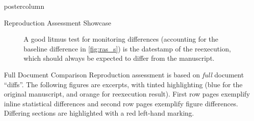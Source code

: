 \begin{frame}
\begin{columns}
\begin{column}{.59\textwidth}
\begin{beamercolorbox}[center]{postercolumn}
\begin{minipage}{.98\textwidth}
{\begin{myblock}{Reproduction Assessment Showcase}
\begin{minipage}{.38\textwidth}
\begin{figure}
{							}
						\end{figure}
						\begin{figure}
							\vspace{0.5em}
							\caption{
								A good litmus test for monitoring differences (accounting for the baseline difference in \cref{fig:ras_s}) is the datestamp of the reexecution, which should always be expected to differ from the manuscript.
							}
						\end{figure}
						\end{minipage}
					\end{myblock}\vfill
					\begin{myblock}{Full Document Comparison}
						\vspace{0.25em}
						Reproduction assessment is based on \textit{full} document “diffs”.
						The following figures are excerpts, with tinted highlighting (blue for the original manuscript, and orange for reexecution result).
						First row pages exemplify inline statistical differences and second row pages exemplify figure differences.
						Differing sections are highlighted with a red left-hand marking.\\
						\vspace{0.75em}
						\\
						\vspace{.3em}
					\end{myblock}\vfill
		}\end{minipage}\end{beamercolorbox}
	\end{column}
\end{columns}
\end{frame}

